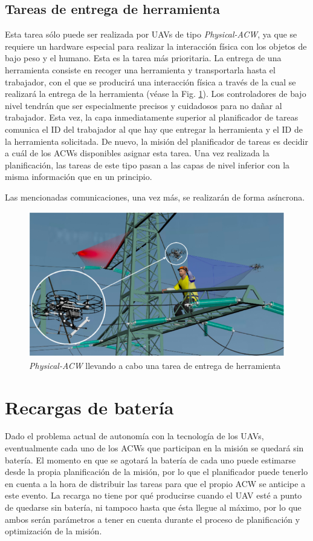 \documentclass[fontsize=11pt, English=false, Español=true, Myfinal=true, twoside, numbers=noenddot]{scrbook}
\begin{document}
\subsection{Tareas de entrega de herramienta}
\label{subsec:ToolDeliveryTasks}
Esta tarea sólo puede ser realizada por \glspl{UAV} de tipo \textit{Physical-ACW}, ya que se requiere un hardware especial para realizar la interacción física con los objetos de bajo peso y el humano. Esta es la tarea más prioritaria. La entrega de una herramienta consiste en recoger una herramienta y transportarla hasta el trabajador, con el que se producirá una interacción física a través de la cual se realizará la entrega de la herramienta (véase la Fig. \ref{fig:deliver_task}). Los controladores de bajo nivel tendrán que ser especialmente precisos y cuidadosos para no dañar al trabajador. Esta vez, la capa inmediatamente superior al planificador de tareas comunica el \gls{ID} del trabajador al que hay que entregar la herramienta y el \gls{ID} de la herramienta solicitada. De nuevo, la misión del planificador de tareas es decidir a cuál de los \glspl{ACW} disponibles asignar esta tarea. Una vez realizada la planificación, las tareas de este tipo pasan a las capas de nivel inferior con la misma información que en un principio.

Las mencionadas comunicaciones, una vez más, se realizarán de forma asíncrona. 


\begin{figure}[htbp]
    \centering
    \includegraphics[width=0.7\linewidth]
    {ProblemFormulation/figures/deliver_task.png}
    \caption{\textit{Physical-ACW} llevando a cabo una tarea de entrega de herramienta}
    \label{fig:deliver_task}
\end{figure}

\section{Recargas de batería}
\label{sec:BatteryRecharges}
Dado el problema actual de autonomía con la tecnología de los \glspl{UAV}, eventualmente cada uno de los \glspl{ACW} que participan en la misión se quedará sin batería. El momento en que se agotará la batería de cada uno puede estimarse desde la propia planificación de la misión, por lo que el planificador puede tenerlo en cuenta a la hora de distribuir las tareas para que el propio \gls{ACW} se anticipe a este evento. La recarga no tiene por qué producirse cuando el \gls{UAV} esté a punto de quedarse sin batería, ni tampoco hasta que ésta llegue al máximo, por lo que ambos serán parámetros a tener en cuenta durante el proceso de planificación y optimización de la misión.
\end{document}
